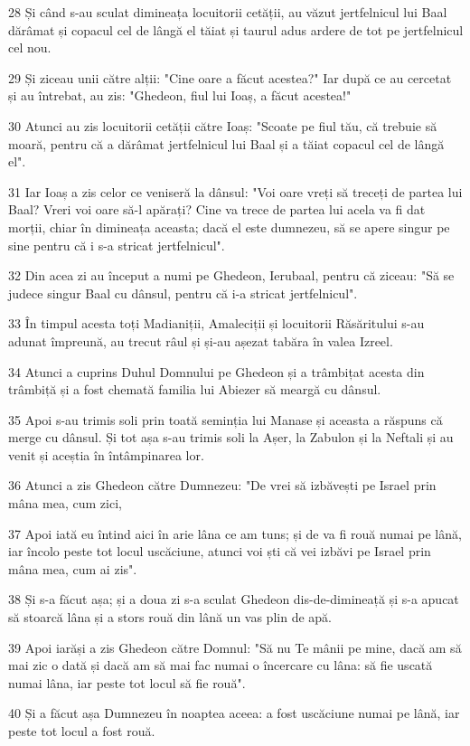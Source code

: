 \par 28 Și când s-au sculat dimineața locuitorii cetății, au văzut jertfelnicul lui Baal dărâmat și copacul cel de lângă el tăiat și taurul adus ardere de tot pe jertfelnicul cel nou.
\par 29 Și ziceau unii către alții: "Cine oare a făcut acestea?" Iar după ce au cercetat și au întrebat, au zis: "Ghedeon, fiul lui Ioaș, a făcut acestea!"
\par 30 Atunci au zis locuitorii cetății către Ioaș: "Scoate pe fiul tău, că trebuie să moară, pentru că a dărâmat jertfelnicul lui Baal și a tăiat copacul cel de lângă el".
\par 31 Iar Ioaș a zis celor ce veniseră la dânsul: "Voi oare vreți să treceți de partea lui Baal? Vreri voi oare să-l apărați? Cine va trece de partea lui acela va fi dat morții, chiar în dimineața aceasta; dacă el este dumnezeu, să se apere singur pe sine pentru că i s-a stricat jertfelnicul".
\par 32 Din acea zi au început a numi pe Ghedeon, Ierubaal, pentru că ziceau: "Să se judece singur Baal cu dânsul, pentru că i-a stricat jertfelnicul".
\par 33 În timpul acesta toți Madianiții, Amaleciții și locuitorii Răsăritului s-au adunat împreună, au trecut râul și și-au așezat tabăra în valea Izreel.
\par 34 Atunci a cuprins Duhul Domnului pe Ghedeon și a trâmbițat acesta din trâmbiță și a fost chemată familia lui Abiezer să meargă cu dânsul.
\par 35 Apoi s-au trimis soli prin toată seminția lui Manase și aceasta a răspuns că merge cu dânsul. Și tot așa s-au trimis soli la Așer, la Zabulon și la Neftali și au venit și aceștia în întâmpinarea lor.
\par 36 Atunci a zis Ghedeon către Dumnezeu: "De vrei să izbăvești pe Israel prin mâna mea, cum zici,
\par 37 Apoi iată eu întind aici în arie lâna ce am tuns; și de va fi rouă numai pe lână, iar încolo peste tot locul uscăciune, atunci voi ști că vei izbăvi pe Israel prin mâna mea, cum ai zis".
\par 38 Și s-a făcut așa; și a doua zi s-a sculat Ghedeon dis-de-dimineață și s-a apucat să stoarcă lâna și a stors rouă din lână un vas plin de apă.
\par 39 Apoi iarăși a zis Ghedeon către Domnul: "Să nu Te mânii pe mine, dacă am să mai zic o dată și dacă am să mai fac numai o încercare cu lâna: să fie uscată numai lâna, iar peste tot locul să fie rouă".
\par 40 Și a făcut așa Dumnezeu în noaptea aceea: a fost uscăciune numai pe lână, iar peste tot locul a fost rouă.

